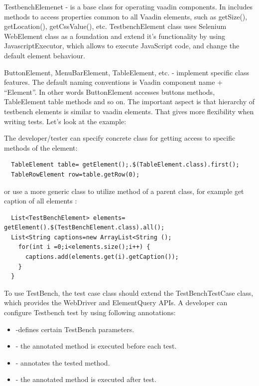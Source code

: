 \documentclass{article}
\begin{document}
TestbenchElemenet - is a base class for operating vaadin components. In includes methods to access properties common to all Vaadin elements, such as getSize(), getLocation(), getCssValue(), etc. TestbenchElement class uses Selenium WebElement class as a foundation and extend it’s functionality by using JavascriptExecutor, which allows to execute JavaScript code, and change the default element behaviour. 

ButtonElement, MenuBarElement, TableElement, etc. - implement specific class features. The default naming conventions is Vaadin component name + “Element”. In other words ButtonElement accesses buttons methods, TableElement table methods and so on. The important aspect is that hierarchy of testbench elements is similar to vaadin elements. That gives more flexibility when writing tests. Let’s look at the example:

The  developer/tester can specify concrete class for getting access to specific methods of the element:
 
 \lstset{language=Java}
  \begin{lstlisting}
  TableElement table= getElement();.$(TableElement.class).first();
  TableRowElement row=table.getRow(0);
 \end{lstlisting}
or use a more generic class to utilize method of a parent class, for example get caption of all elements :

  \lstset{language=Java}
  \begin{lstlisting}
  List<TestBenchElement> elements= getElement().$(TestBenchElement.class).all();
  List<String captions=new ArrayList<String ();
    for(int i =0;i<elements.size();i++) {
      captions.add(elements.get(i).getCaption());
    }
  }
  \end{lstlisting}

To use TestBench, the test case class should extend the TestBenchTestCase class,
which provides the WebDriver and ElementQuery APIs. A developer
can configure Testbench test by using following annotations:
\begin{itemize}
  \item \@Rule -defines certain TestBench parameters.
  \item \@Before - the annotated method is executed before each test.
  \item \@Test - annotates the tested method.
  \item \@After - the annotated method is executed after test.
\end{itemize}
\end{document}
